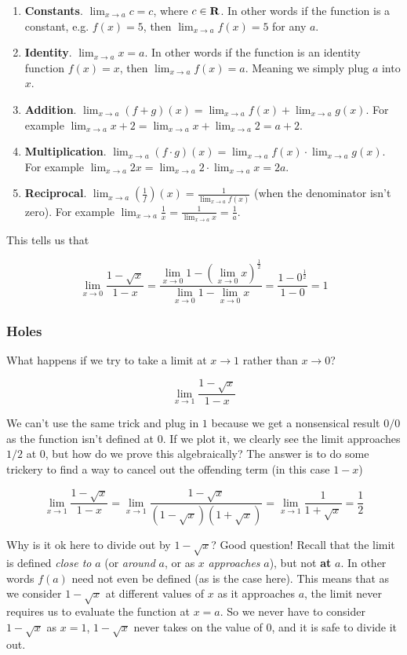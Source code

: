 \begin{enumerate}
\item \textbf{Constants}. $\lim_{x\to a}c=c$, where $c\in\mathbf{R}$. In other
  words if the function is a constant, e.g. $f(x)=5$, then
  $\lim_{x\to a}f(x)=5$ for any $a$.
\item \textbf{Identity}. $\lim_{x\to a}x=a$. In other words if the
  function is an identity function $f(x)=x$, then
  $\lim_{x\to a}f(x)=a$. Meaning we simply plug $a$ into $x$.
\item \textbf{Addition}.
  $\lim_{x\to a}(f+g)(x)=\lim_{x\to a}f(x)+\lim_{x\to a}g(x)$. For example
  $\lim_{x\to a}x+2=\lim_{x\to a}x+\lim_{x\to a}2=a+2$.
\item \textbf{Multiplication}.
  $\lim_{x\to a}(f\cdot g)(x)=\lim_{x\to a}f(x)\cdot \lim_{x\to a}g(x)$. For example
  $\lim_{x\to a}2x=\lim_{x\to a}2\cdot \lim_{x\to a}x=2a$.
\item \textbf{Reciprocal}.
  $\lim_{x\to a}\left(\frac{1}{f}\right)(x)=\frac{1}{\lim_{x\to a}f(x)}$
  (when the denominator isn't zero). For example
  $\lim_{x\to a}\frac{1}{x}=\frac{1}{\lim_{x\to a}x}=\frac{1}{a}$.
\end{enumerate}

This tells us that

\[\lim_{x\to 0}\frac{1-\sqrt{x}}{1-x}=\frac{\lim_{x\to 0}1-(\lim_{x\to 0}x)^{\frac{1}{2}}}{\lim_{x\to 0}1-\lim_{x\to 0}x}=\frac{1-0^{\frac{1}{2}}}{1-0}=1\]

\subsubsection{Holes}

What happens if we try to take a limit at $x\to 1$ rather than $x\to 0$?

\[\lim_{x\to 1}\frac{1-\sqrt{x}}{1-x}\]

We can't use the same trick and plug in $1$ because we get a
nonsensical result $0/0$ as the function isn't defined at $0$. If we
plot it, we clearly see the limit approaches $1/2$ at $0$, but how do
we prove this algebraically? The answer is to do some trickery to find
a way to cancel out the offending term (in this case $1-x$)

\[\lim_{x\to 1}\frac{1-\sqrt{x}}{1-x}=\lim_{x\to 1}\frac{1-\sqrt{x}}{(1-\sqrt{x})(1+\sqrt{x})}=\lim_{x\to 1}\frac{1}{1+\sqrt{x}}=\frac{1}{2}\]

\vs

Why is it ok here to divide out by $1-\sqrt{x}$? Good question! Recall
that the limit is defined \textit{close to} $a$ (or \textit{around}
$a$, or as $x$ \textit{approaches} $a$), but not \textbf{at} $a$. In
other words $f(a)$ need not even be defined (as is the case here).
This means that as we consider $1-\sqrt{x}$ at different values of $x$
as it approaches $a$, the limit never requires us to evaluate the
function at $x=a$. So we never have to consider $1-\sqrt{x}$ as $x=1$,
$1-\sqrt{x}$ never takes on the value of $0$, and it is safe to divide
it out.

